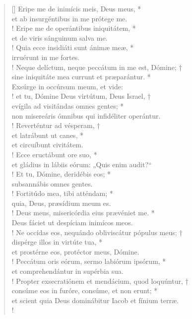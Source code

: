 \begin{verse}[\versewidth]
Eripe me de inimícis meis, Deus meus, *\\
et ab insurgéntibus in me prótege me.\\!
\vin Eripe me de operántibus iniquitátem, *\\
\vin et de viris sánguinum salva me.\\!
Quia ecce insidiáti sunt ánimæ meæ, *\\
irruérunt in me fortes.\\!
\vin Neque delíctum, neque peccátum in me est, Dómine; †\\
\vin sine iniquitáte mea currunt et præparántur. *\\
\vin Exsúrge in occúrsum meum, et vide:\\!
et tu, Dómine Deus virtútum, Deus Israel, †\\
evígila ad visitándas omnes gentes; *\\
non misereáris ómnibus qui infidéliter operántur.\\!
\vin Reverténtur ad vésperam, †\\
\vin et latrábunt ut canes, *\\
\vin et circuíbunt civitátem.\\!
Ecce eructábunt ore suo, *\\
et gládius in lábiis eórum: „Quis enim audit?“\\!
\vin Et tu, Dómine, deridébis eos; *\\
\vin subsannábis omnes gentes.\\!
Fortitúdo mea, tibi atténdam; *\\
quia, Deus, præsídium meum es.\\!
\vin Deus meus, misericórdia eius prævéniet me. *\\
\vin Deus fáciet ut despíciam inimícos meos.\\!
Ne occídas eos, nequándo obliviscátur pópulus meus; †\\
dispérge illos in virtúte tua, *\\
et prostérne eos, protéctor meus, Dómine.\\!
\vin Peccátum oris eórum, sermo labiórum ipsórum, *\\
\vin et comprehendántur in supérbia sua.\\!
Propter exsecratiónem et mendácium, quod loquúntur, †\\
consúme eos in furóre, consúme, et non erunt; *\\
et scient quia Deus dominábitur Iacob et fínium terræ.\\!

\end{verse}
